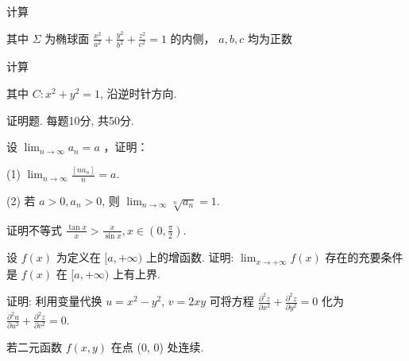 计算\par
\nopagebreak[4]
其中 $\Sigma$ 为椭球面 $\frac{x^2}{a^2} +\frac{y^2}{b^2} +\frac{z^2}{c^2} = 1$ 的内侧， $a,b,c$ 均为正数\par
\par{}
计算\par
\nopagebreak[4]
其中 $C: x^{2} + y^{2} = 1$, 沿逆时针方向.\par
\par{}
证明题. 每题10分, 共50分.\par
设 $\lim_{n\to \infty}a_n = a$ ，证明：\par
(1) $\lim_{n\to \infty}\frac{[na_n]}{n} = a.$\par
(2) 若 $a > 0, a_n > 0$, 则 $\lim_{n \to \infty} \sqrt[n]{a_n} = 1$.\par
证明不等式 $\frac{\tan x}{x} > \frac{x}{\sin x}, x \in \left(0, \frac{\pi}{2}\right)$.\par
设 $f(x)$ 为定义在 $[a, +\infty)$ 上的增函数. 证明: $\lim_{x \to +\infty} f(x)$ 存在的充要条件是 $f(x)$ 在 $[a, +\infty)$ 上有上界.\par
证明: 利用变量代换 $u = x^{2} - y^{2}$, $v = 2xy$ 可将方程 $\frac{\partial^2 z}{\partial x^2} + \frac{\partial^2 z}{\partial y^2} = 0$ 化为 $\frac{\partial^2 u}{\partial u^2} + \frac{\partial^2 z}{\partial v^2} = 0$.\par
若二元函数 $f(x, y)$ 在点 (0, 0) 处连续.\par
